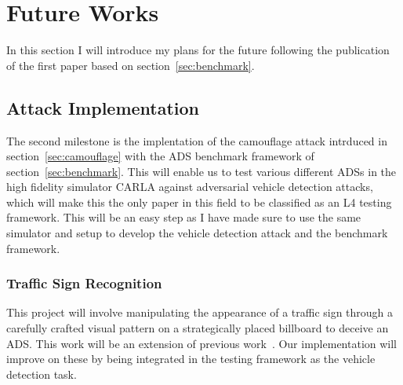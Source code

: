 \documentclass[a4paper]{article}
\begin{document}
\pagebreak


\section{Future Works}
In this section I will introduce my plans for the future following the publication of the first paper based on section~\ref{sec:benchmark}.
\subsection{Attack Implementation}
The second milestone is the implentation of the camouflage attack intrduced in section~\ref{sec:camouflage} with the ADS benchmark framework of section~\ref{sec:benchmark}. This will enable us to test various different ADSs in the high fidelity simulator CARLA against adversarial vehicle detection attacks, which will make this the only paper in this field to be classified as an L4 testing framework. This will be an easy step as I have made sure to use the same simulator and setup to develop the vehicle detection attack and the benchmark framework.
\subsubsection{Traffic Sign Recognition}
This project will involve manipulating the appearance of a traffic sign through a carefully crafted visual pattern on a strategically placed billboard to deceive an ADS. This work will be an extension of previous work~\cite{zolfi2021translucent,patel2020bait}. Our implementation will improve on these by being integrated in the testing framework as the vehicle detection task.
\end{document}
